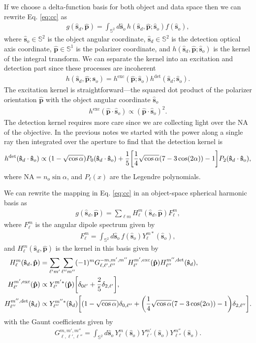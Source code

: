 \documentclass[11pt]{article}
\providecommand{\so}{\mathbf{\hat{s}}_o}
\providecommand{\sd}{\mathbf{\hat{s}}_d}
\providecommand{\pp}{\mathbf{\hat{p}}}
\providecommand{\mbb}[1]{\mathbb{#1}}
\providecommand{\ints}[1]{\int_{\mbb{S}^{#1}}}
\let\originalleft\left
\let\originalright\right
\renewcommand{\left}{\mathopen{}\mathclose\bgroup\originalleft}
\renewcommand{\right}{\aftergroup\egroup\originalright}
\begin{document}
If we choose a delta-function basis for both object and data space then we can
rewrite Eq. \eqref{eq:cc} as 
\begin{align}
  g(\sd, \pp) = \ints{2}d\so\, h(\sd,\pp;\so)f(\so),\label{eq:fwd}
\end{align}
where $\so \in \mbb{S}^2$ is the object angular coordinate, $\sd \in \mbb{S}^2$
is the detection optical axis coordinate, $\pp \in \mbb{S}^1$ is the polarizer
coordinate, and $h(\sd,\pp;\so)$ is the kernel of the integral transform. We can
separate the kernel into an excitation and detection part since these processes
are incoherent
\begin{align}
  h(\sd, \pp;\so) = h^{\text{exc}}(\pp;\so)h^{\text{det}}(\sd;\so). \label{eq:kern}
\end{align}
The excitation kernel is straightforward---the squared dot product of the
polarizer orientation $\pp$ with the object angular coordinate $\so$
\begin{align}
  h^{\text{exc}}(\pp\cdot\so) \propto (\pp\cdot\so)^2. \label{eq:exckern}
\end{align}
The detection kernel requires more care since we are collecting light over the
NA of the objective. In the previous notes we started with the power along a
single ray then integrated over the aperture to find that the detection kernel is
\begin{align}
  h^{\text{det}}(\sd\cdot\so) \propto (1 - \sqrt{\cos\alpha})P_0(\sd\cdot\so) + \frac{1}{5}\left[\frac{1}{4}\sqrt{\cos\alpha}(7-3\cos(2\alpha)) - 1\right]P_2(\sd\cdot\so),
\end{align}
where $\text{NA} = n_o\sin\alpha$, and $P_{\ell}(x)$ are the Legendre
polynomials.

We can rewrite the mapping in Eq. \eqref{eq:cc} in an object-space spherical
harmonic basis as
\begin{align}
  g(\sd, \pp) = \sum_{\ell m}H_\ell^m(\sd, \pp)F_\ell^m,\label{eq:fwdsh}
\end{align}
where $F_\ell^m$ is the angular dipole spectrum given by 
\begin{align}
  F_\ell^m = \int_{\mbb{S}^2}d\so\, f(\so)Y_\ell^{m*}(\so),
\end{align}
and $H_\ell^m(\sd, \pp)$ is the kernel in this basis given by
\begin{align}
  H_\ell^m(\sd, \pp) &= \sum_{\ell' m'}\sum_{\ell'' m''}(-1)^m G_{\ell,\ell',\ell''}^{-m,m',m''}H_{\ell'}^{m',\text{exc}}(\pp)H_{\ell''}^{m'',\text{det}}(\sd),\label{eq:triple4}\\
    H_{\ell'}^{m',\text{exc}}(\pp) &\propto Y_{\ell'}^{m'*}(\pp)\left[\delta_{0\ell'} + \frac{2}{5}\delta_{2,\ell'}\right],\label{eq:dipexc}\\
    H_{\ell''}^{m'',\text{det}}(\sd) &\propto Y_{\ell''}^{m''*}(\sd)\left[(1 - \sqrt{\cos\alpha})\delta_{0,\ell''} + \left(\frac{1}{4}\sqrt{\cos\alpha}(7-3\cos(2\alpha)) - 1\right)\delta_{2,\ell''}\right].\label{eq:dipdet}
\end{align}
with the Gaunt coefficients given by 
\begin{align}
  G_{\ell,\ell',\ell''}^{m,m',m''} = \ints{2}d\so\, Y_\ell^{m}(\so)Y_{\ell'}^{m'}(\so)Y_{\ell''}^{m''}(\so).
\end{align}
\end{document}
